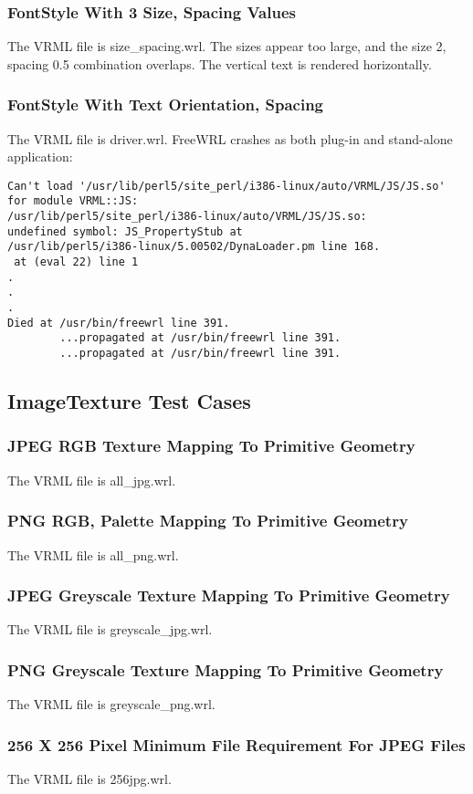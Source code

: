 \documentclass[12pt,letterpaper]{article}
\newcommand{\FSF}{FontStyle With 3 Size, Spacing Values}
\newcommand{\FSG}{FontStyle With Text Orientation, Spacing}
\newcommand{\ITA}{JPEG RGB Texture Mapping To Primitive Geometry}
\newcommand{\ITB}{PNG RGB, Palette Mapping To Primitive Geometry}
\newcommand{\ITC}{JPEG Greyscale Texture Mapping To Primitive Geometry}
\newcommand{\ITD}{PNG Greyscale Texture Mapping To Primitive Geometry}
\newcommand{\ITE}{256 X 256 Pixel Minimum File Requirement For JPEG Files}
\begin{document}
\subsubsection{\FSF}
The VRML file is size\_spacing.wrl.\newline
The sizes appear too large, and the size 2, spacing 0.5 combination overlaps.
The vertical text is rendered horizontally.  

\subsubsection{\FSG}
The VRML file is driver.wrl.\newline
FreeWRL crashes as both plug-in and stand-alone application:
\begin{verbatim}
Can't load '/usr/lib/perl5/site_perl/i386-linux/auto/VRML/JS/JS.so' 
for module VRML::JS:
/usr/lib/perl5/site_perl/i386-linux/auto/VRML/JS/JS.so:
undefined symbol: JS_PropertyStub at
/usr/lib/perl5/i386-linux/5.00502/DynaLoader.pm line 168.
 at (eval 22) line 1
.
.
.
Died at /usr/bin/freewrl line 391.
        ...propagated at /usr/bin/freewrl line 391.
        ...propagated at /usr/bin/freewrl line 391.
\end{verbatim}

\subsection{ImageTexture Test Cases}

\subsubsection{\ITA}
\label{sec:jpeg-rgb}
The VRML file is all\_jpg.wrl.

\subsubsection{\ITB}
The VRML file is all\_png.wrl.

\subsubsection{\ITC}
The VRML file is greyscale\_jpg.wrl.

\subsubsection{\ITD}
The VRML file is greyscale\_png.wrl.

\subsubsection{\ITE}
The VRML file is 256jpg.wrl.
\end{document}
